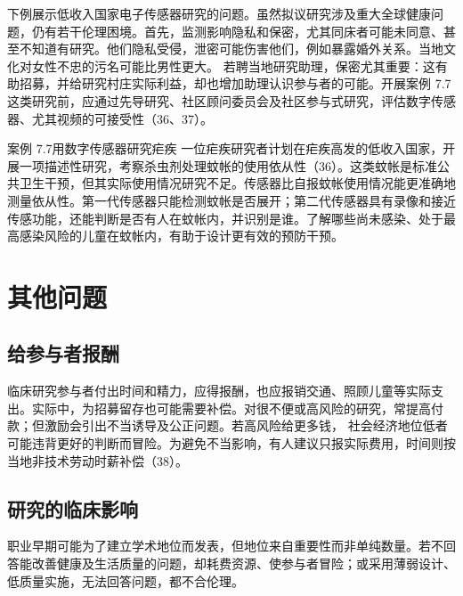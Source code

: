 下例展示低收入国家电子传感器研究的问题。虽然拟议研究涉及重大全球健康问题，仍有若干伦理困境。首先，监测影响隐私和保密，尤其同床者可能未同意、甚至不知道有研究。他们隐私受侵，泄密可能伤害他们，例如暴露婚外关系。当地文化对女性不忠的污名可能比男性更大。
若聘当地研究助理，保密尤其重要：这有助招募，并给研究村庄实际利益，却也增加助理认识参与者的可能。开展案例 7.7 这类研究前，应通过先导研究、社区顾问委员会及社区参与式研究，评估数字传感器、尤其视频的可接受性（36、37）。
\begin{bookbox}{案例 7.7\quad 用数字传感器研究疟疾}
一位疟疾研究者计划在疟疾高发的低收入国家，开展一项描述性研究，考察杀虫剂处理蚊帐的使用依从性（36）。这类蚊帐是标准公共卫生干预，但其实际使用情况研究不足。传感器比自报蚊帐使用情况能更准确地测量依从性。第一代传感器只能检测蚊帐是否展开；第二代传感器具有录像和接近传感功能，还能判断是否有人在蚊帐内，并识别是谁。了解哪些尚未感染、处于最高感染风险的儿童在蚊帐内，有助于设计更有效的预防干预。
\end{bookbox}

\section{其他问题}
\subsection{给参与者报酬}
临床研究参与者付出时间和精力，应得报酬，也应报销交通、照顾儿童等实际支出。实际中，为招募留存也可能需要补偿。对很不便或高风险的研究，常提高付款；但激励会引出不当诱导及公正问题。若高风险给更多钱，
社会经济地位低者可能违背更好的判断而冒险。为避免不当影响，有人建议只报实际费用，时间则按当地非技术劳动时薪补偿（38）。

\subsection{研究的临床影响}
职业早期可能为了建立学术地位而发表，但地位来自重要性而非单纯数量。若不回答能改善健康及生活质量的问题，却耗费资源、使参与者冒险；或采用薄弱设计、低质量实施，无法回答问题，都不合伦理。

